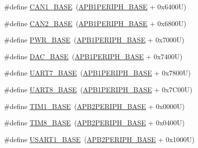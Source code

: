 \begin{DoxyCompactItemize}
\item 
\#define \hyperlink{group___peripheral__memory__map_gad8e45ea6c032d9fce1b0516fff9d8eaa}{C\+A\+N1\+\_\+\+B\+A\+SE}~(\hyperlink{group___peripheral__memory__map_ga45666d911f39addd4c8c0a0ac3388cfb}{A\+P\+B1\+P\+E\+R\+I\+P\+H\+\_\+\+B\+A\+SE} + 0x6400\+U)
\item 
\#define \hyperlink{group___peripheral__memory__map_gaf7b8267b0d439f8f3e82f86be4b9fba1}{C\+A\+N2\+\_\+\+B\+A\+SE}~(\hyperlink{group___peripheral__memory__map_ga45666d911f39addd4c8c0a0ac3388cfb}{A\+P\+B1\+P\+E\+R\+I\+P\+H\+\_\+\+B\+A\+SE} + 0x6800\+U)
\item 
\#define \hyperlink{group___peripheral__memory__map_gac691ec23dace8b7a649a25acb110217a}{P\+W\+R\+\_\+\+B\+A\+SE}~(\hyperlink{group___peripheral__memory__map_ga45666d911f39addd4c8c0a0ac3388cfb}{A\+P\+B1\+P\+E\+R\+I\+P\+H\+\_\+\+B\+A\+SE} + 0x7000\+U)
\item 
\#define \hyperlink{group___peripheral__memory__map_gad18d0b914c7f68cecbee1a2d23a67d38}{D\+A\+C\+\_\+\+B\+A\+SE}~(\hyperlink{group___peripheral__memory__map_ga45666d911f39addd4c8c0a0ac3388cfb}{A\+P\+B1\+P\+E\+R\+I\+P\+H\+\_\+\+B\+A\+SE} + 0x7400\+U)
\item 
\#define \hyperlink{group___peripheral__memory__map_ga3150e4b10ec876c0b20f22de12a8fa40}{U\+A\+R\+T7\+\_\+\+B\+A\+SE}~(\hyperlink{group___peripheral__memory__map_ga45666d911f39addd4c8c0a0ac3388cfb}{A\+P\+B1\+P\+E\+R\+I\+P\+H\+\_\+\+B\+A\+SE} + 0x7800\+U)
\item 
\#define \hyperlink{group___peripheral__memory__map_gac9c6cd59a248941d9d2462ab21a2346e}{U\+A\+R\+T8\+\_\+\+B\+A\+SE}~(\hyperlink{group___peripheral__memory__map_ga45666d911f39addd4c8c0a0ac3388cfb}{A\+P\+B1\+P\+E\+R\+I\+P\+H\+\_\+\+B\+A\+SE} + 0x7\+C00\+U)
\item 
\#define \hyperlink{group___peripheral__memory__map_gaf8aa324ca5011b8173ab16585ed7324a}{T\+I\+M1\+\_\+\+B\+A\+SE}~(\hyperlink{group___peripheral__memory__map_ga25b99d6065f1c8f751e78f43ade652cb}{A\+P\+B2\+P\+E\+R\+I\+P\+H\+\_\+\+B\+A\+SE} + 0x0000\+U)
\item 
\#define \hyperlink{group___peripheral__memory__map_ga5b72f698b7a048a6f9fcfe2efe5bc1db}{T\+I\+M8\+\_\+\+B\+A\+SE}~(\hyperlink{group___peripheral__memory__map_ga25b99d6065f1c8f751e78f43ade652cb}{A\+P\+B2\+P\+E\+R\+I\+P\+H\+\_\+\+B\+A\+SE} + 0x0400\+U)
\item 
\#define \hyperlink{group___peripheral__memory__map_ga86162ab3f740db9026c1320d46938b4d}{U\+S\+A\+R\+T1\+\_\+\+B\+A\+SE}~(\hyperlink{group___peripheral__memory__map_ga25b99d6065f1c8f751e78f43ade652cb}{A\+P\+B2\+P\+E\+R\+I\+P\+H\+\_\+\+B\+A\+SE} + 0x1000\+U)

\end{DoxyCompactItemize}

